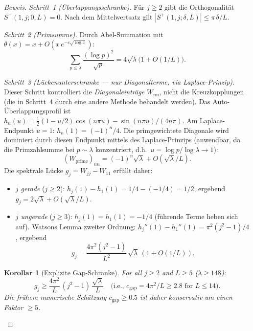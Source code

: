 ﻿\documentclass[12pt,a4paper]{article}
\newtheorem{corollary}[theorem]{Korollar}
\theoremstyle{definition}
\theoremstyle{remark}
\begin{document}
\begin{proof}[Beweis]
\emph{Schritt~1 (Überlappungsschranke).} Für $j \geq 2$ gibt die Orthogonalität
$S^+(1,j;0,L)=0$. Nach dem Mittelwertsatz gilt
$|S^+(1,j;\delta,L)| \leq \pi\,\delta/L$.

\emph{Schritt~2 (Primsumme).} Durch Abel-Summation mit $\theta(x) = x + O(x\,e^{-c\sqrt{\log x}})$:
\[
  \sum_{p \leq \lambda}\frac{(\log p)^2}{\sqrt{p}} = 4\sqrt{\lambda}\bigl(1 + O(1/L)\bigr).
\]

\emph{Schritt~3 (Lückenunterschranke --- nur Diagonalterme, via Laplace-Prinzip).} Dieser Schritt kontrolliert die \emph{Diagonaleinträge} $W_{nn}$, nicht die Kreuzkopplungen (die in Schritt~4 durch eine andere Methode behandelt werden). Das Auto-Überlappungsprofil ist $h_n(u) = \tfrac{1}{2}(1-u/2)\cos(n\pi u) - \sin(n\pi u)/(4n\pi)$. Am Laplace-Endpunkt $u = 1$: $h_n(1) = (-1)^n/4$. Die primgewichtete Diagonale wird dominiert durch diesen Endpunkt mittels des Laplace-Prinzips (anwendbar, da die Primzahlsumme bei $p \sim \lambda$ konzentriert, d.h.\ $u = \log p / \log\lambda \to 1$):
\[
  (W_{\mathrm{prime}})_{nn} = (-1)^n\sqrt{\lambda} + O(\sqrt{\lambda}/L).
\]
Die spektrale Lücke $g_j = W_{jj} - W_{11}$ erfüllt daher:
\begin{itemize}
  \item \emph{$j$ gerade} ($j \geq 2$): $h_j(1) - h_1(1) = 1/4 - (-1/4) = 1/2$, ergebend $g_j = 2\sqrt{\lambda} + O(\sqrt{\lambda}/L)$.
  \item \emph{$j$ ungerade} ($j \geq 3$): $h_j(1) = h_1(1) = -1/4$ (führende Terme heben sich auf). Watsons Lemma zweiter Ordnung: $h_j''(1) - h_1''(1) = \pi^2(j^2-1)/4$, ergebend
  \begin{equation}
  \label{eq:gap-odd}
    g_j = \frac{4\pi^2(j^2-1)}{L^2}\,\sqrt{\lambda}\,(1 + O(1/L)).
  \end{equation}
\end{itemize}

\begin{corollary}[Explizite Gap-Schranke]
\label{cor:explicit-gap}
For all $j \geq 2$ and $L \geq 5$ ($\lambda \geq 148$):
\[
  g_j \geq \frac{4\pi^2}{L}\,(j^2 - 1)\,\frac{\sqrt{\lambda}}{L}
  \quad\text{(i.e., } c_{\mathrm{gap}} = 4\pi^2/L \geq 2.8 \text{ for } L \leq 14\text{)}.
\]
Die frühere numerische Schätzung $c_{\mathrm{gap}} \geq 0.5$ ist daher konservativ um einen Faktor $\geq 5$.
\end{corollary}


\end{proof}
\end{document}
